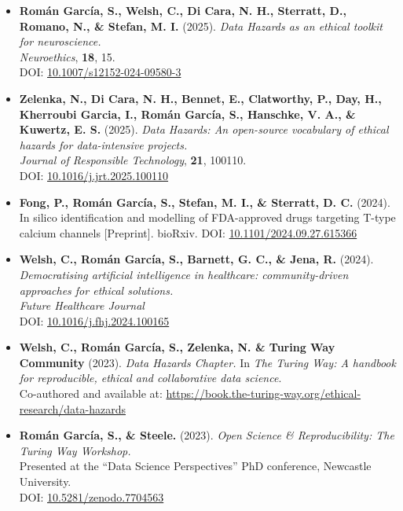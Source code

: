 \documentclass[
  11pt,
  letterpaper,
]{scrreprt}
\begin{document}
\begin{itemize}
\item
  \textbf{Román García, S., Welsh, C., Di Cara, N. H., Sterratt, D.,
  Romano, N., \& Stefan, M. I.} (2025). \emph{Data Hazards as an ethical
  toolkit for neuroscience.}\\
  \emph{Neuroethics}, \textbf{18}, 15.\\
  DOI:
  \href{https://doi.org/10.1007/s12152-024-09580-3}{10.1007/s12152-024-09580-3}
\item
  \textbf{Zelenka, N., Di Cara, N. H., Bennet, E., Clatworthy, P., Day,
  H., Kherroubi Garcia, I., Román García, S., Hanschke, V. A., \&
  Kuwertz, E. S.} (2025). \emph{Data Hazards: An open-source vocabulary
  of ethical hazards for data-intensive projects.}\\
  \emph{Journal of Responsible Technology}, \textbf{21}, 100110.\\
  DOI:
  \href{https://doi.org/10.1016/j.jrt.2025.100110}{10.1016/j.jrt.2025.100110}
\item
  \textbf{Fong, P., Román García, S., Stefan, M. I., \& Sterratt, D. C.}
  (2024). In silico identification and modelling of FDA-approved drugs
  targeting T-type calcium channels {[}Preprint{]}. bioRxiv. DOI:
  \href{https://doi.org/10.1101/2024.09.27.615366}{10.1101/2024.09.27.615366}
\item
  \textbf{Welsh, C., Román García, S., Barnett, G. C., \& Jena, R.}
  (2024). \emph{Democratising artificial intelligence in healthcare:
  community-driven approaches for ethical solutions.}\\
  \emph{Future Healthcare Journal}\\
  DOI:
  \href{https://doi.org/10.1016/j.fhj.2024.100165}{10.1016/j.fhj.2024.100165}
\item
  \textbf{Welsh, C., Román García, S., Zelenka, N. \& Turing Way
  Community} (2023). \emph{Data Hazards Chapter.} In \emph{The Turing
  Way: A handbook for reproducible, ethical and collaborative data
  science}.\\
  Co-authored and available at:
  \url{https://book.the-turing-way.org/ethical-research/data-hazards}
\item
  \textbf{Román García, S., \& Steele.} (2023). \emph{Open Science \&
  Reproducibility: The Turing Way Workshop.}\\
  Presented at the ``Data Science Perspectives'' PhD conference,
  Newcastle University.\\
  DOI:
  \href{https://doi.org/10.5281/zenodo.7704563}{10.5281/zenodo.7704563}

\end{itemize}
\end{document}
